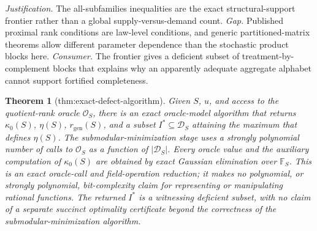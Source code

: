 \documentclass{article}
\newtheorem{theorem}{Theorem}
\begin{document}
\par\smallskip\noindent \textit{Justification.} The all-subfamilies inequalities are the exact structural-support frontier rather than a global supply-versus-demand count. \textit{Gap.} Published proximal rank conditions are law-level conditions, and generic partitioned-matrix theorems allow different parameter dependence than the stochastic product blocks here. \textit{Consumer.} The frontier gives a deficient subset of treatment-by-complement blocks that explains why an apparently adequate aggregate alphabet cannot support fortified completeness.

\begin{theorem}[thm:exact-defect-algorithm]\label{thm:exact-defect-algorithm}
Given \(S\), \(u\), and access to the quotient-rank oracle \(\mathcal O_S\), there is an exact oracle-model algorithm that returns \(\kappa_0(S)\), \(\eta(S)\), \(r_{\mathrm{gen}}(S)\), and a subset \(I^*\subseteq\mathcal D_S\) attaining the maximum that defines \(\eta(S)\).  The submodular-minimization stage uses a strongly polynomial number of calls to \(\mathcal O_S\) as a function of \(|\mathcal D_S|\).  Every oracle value and the auxiliary computation of \(\kappa_0(S)\) are obtained by exact Gaussian elimination over \(\mathbb F_S\).  This is an exact oracle-call and field-operation reduction; it makes no polynomial, or strongly polynomial, bit-complexity claim for representing or manipulating rational functions.  The returned \(I^*\) is a witnessing deficient subset, with no claim of a separate succinct optimality certificate beyond the correctness of the submodular-minimization algorithm.
\end{theorem}
\end{document}
